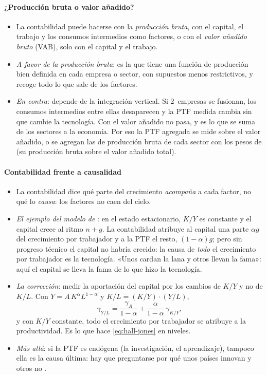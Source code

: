 \documentclass[11pt]{article}
\begin{document}
\paragraph{¿Producción bruta o valor añadido?}

\begin{itemize}
\item La contabilidad puede hacerse con la \emph{producción bruta}, con el capital, el trabajo y los consumos intermedios como factores, o con el \emph{valor añadido bruto} (VAB), solo con el capital y el trabajo.
\item \emph{A favor de la producción bruta}: es la que tiene una función de producción bien definida en cada empresa o sector, con supuestos menos restrictivos, y recoge todo lo que sale de los factores.
\item \emph{En contra}: depende de la integración vertical. Si 2~empresas se fusionan, los consumos intermedios entre ellas desaparecen y la PTF medida cambia sin que cambie la tecnología. Con el valor añadido no pasa, y es lo que se suma de los sectores a la economía. Por eso la PTF agregada se mide sobre el valor añadido, o se agregan las de producción bruta de cada sector con los pesos de  (su producción bruta sobre el valor añadido total).
\end{itemize}

\paragraph{Contabilidad frente a causalidad}

\begin{itemize}
\item La contabilidad dice qué parte del crecimiento \emph{acompaña} a cada factor, no qué lo \emph{causa}: los factores no caen del cielo.
\item \emph{El ejemplo del modelo de } : en el estado estacionario, $K/Y$ es constante y el capital crece al ritmo $n+g$. La contabilidad atribuye al capital una parte $\alpha g$ del crecimiento por trabajador y a la PTF el resto, $(1-\alpha)g$; pero sin progreso técnico el capital no habría crecido: la causa de \emph{todo} el crecimiento por trabajador es la tecnología. «Unos cardan la lana y otros llevan la fama»: aquí el capital se lleva la fama de lo que hizo la tecnología.
\item \emph{La corrección}: medir la aportación del capital por los cambios de $K/Y$ y no de $K/L$. Con $Y=A\,K^{\alpha}L^{1-\alpha}$ y $K/L=(K/Y)\cdot(Y/L)$,
  \begin{equation}
  \gamma_{Y/L}=\frac{\gamma_A}{1-\alpha}+\frac{\alpha}{1-\alpha}\,\gamma_{K/Y},\label{eq:causalidad}
  \end{equation}
  y con $K/Y$ constante, todo el crecimiento por trabajador se atribuye a la productividad\nocite{KlenowRodriguezClare1997Neoclassical}. Es lo que hace \eqref{eq:hall-jones} en niveles.
\item \emph{Más allá}: si la PTF es endógena (la investigación, el aprendizaje), tampoco ella es la causa última: hay que preguntarse por qué unos países innovan y otros no .
\end{itemize}
\end{document}
